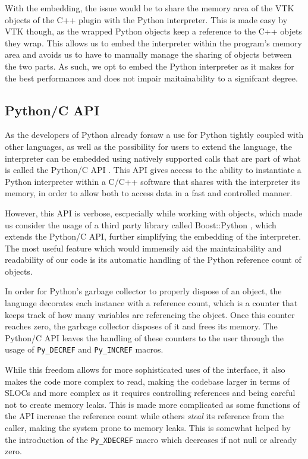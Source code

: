 With the embedding, the issue would be to share the memory area of the VTK objects of the C++ plugin with the Python interpreter. This is made easy by VTK though, as the wrapped Python objects keep a reference to the C++ objets they wrap. This allows us to embed the interpreter within the program's memory area and avoids us to have to manually manage the sharing of objects between the two parts. As such, we opt to embed the Python interpreter as it makes for the best performances and does not impair maitainability to a signifcant degree.

\subsection{Python/C API}

As the developers of Python already forsaw a use for Python tightly coupled with other languages, as well as the possibility for users to extend the language, the interpreter can be embedded using natively supported calls that are part of what is called the Python/C API \cite{python_c_api}. This API gives access to the ability to instantiate a Python interpreter within a C/C++ software that shares with the interpreter its memory, in order to allow both to access data in a fast and controlled manner.

However, this API is verbose, escpecially while working with objects, which made us consider the usage of a third party library called Boost::Python
, which extends the Python/C API, further simplifying the embedding of the interpreter. The most useful feature which would immensily aid the maintainability and readability of our code is its automatic handling of the Python reference count of objects.

In order for Python's garbage collector to properly dispose of an object, the language decorates each instance with a reference count, which is a counter that keeps track of how many variables are referencing the object. Once this counter reaches zero, the garbage collector disposes of it and frees its memory. The Python/C API leaves the handling of these counters to the user through the usage of \verb|Py_DECREF| and \verb|Py_INCREF| macros.

While this freedom allows for more sophisticated uses of the interface, it also makes the code more complex to read, making the codebase larger in terms of SLOCs and more complex as it requires controlling references and being careful not to create memory leaks. This is made more complicated as some functions of the API increase the reference count while others \textit{steal} its reference from the caller, making the system prone to memory leaks. This is somewhat helped by the introduction of the \verb|Py_XDECREF| macro which decreases if not null or already zero.

